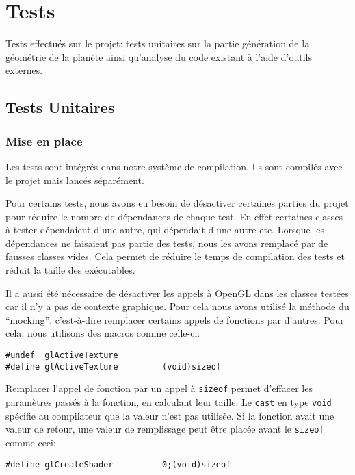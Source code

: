 \chapter{Tests}\label{tests}

Tests effectués sur le projet: tests unitaires sur la partie génération
de la géométrie de la planète ainsi qu'analyse du code existant à l'aide
d'outils externes.

\section{Tests Unitaires}

\subsection{Mise en place}

Les tests sont intégrés dans notre système de compilation. Ils sont
compilés avec le projet mais lancés séparément.

Pour certains tests, nous avons eu besoin de désactiver certaines
parties du projet pour réduire le nombre de dépendances de chaque test.
En effet certaines classes à tester dépendaient d'une autre, qui dépendait
d'une autre etc. Lorsque les dépendances ne faisaient pas partie des
tests, nous les avons remplacé par de fausses classes vides. Cela permet
de réduire le temps de compilation des tests et réduit la taille des
exécutables.

Il a aussi été nécessaire de désactiver les appels à OpenGL dans les
classes testées car il n'y a pas de contexte graphique. Pour cela nous
avons utilisé la méthode du ``mocking'', c'est-à-dire remplacer certains
appels de fonctions par d'autres. Pour cela, nous utilisons des macros
comme celle-ci:

\lstset{language=C++}
\begin{lstlisting}
#undef  glActiveTexture
#define glActiveTexture         (void)sizeof
\end{lstlisting}

Remplacer l'appel de fonction par un appel à \texttt{sizeof} permet
d'effacer les paramètres passés à la fonction, en calculant leur taille.
Le \texttt{cast} en type \texttt{void} spécifie au compilateur que la valeur
n'est pas utilisée. Si la fonction avait une valeur de retour, une
valeur de remplissage peut être placée avant le \texttt{sizeof} comme
ceci:

\lstset{language=C++}
\begin{lstlisting}
#define glCreateShader          0;(void)sizeof
\end{lstlisting}


